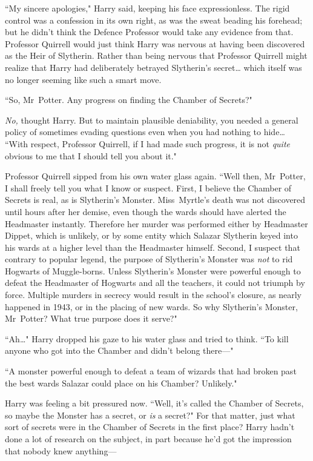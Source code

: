 ``My sincere apologies," Harry said, keeping his face expressionless. The rigid control was a confession in its own right, as was the sweat beading his forehead; but he didn't think the Defence Professor would take any evidence from that. Professor Quirrell would just think Harry was nervous at having been discovered as the Heir of Slytherin. Rather than being nervous that Professor Quirrell might realize that Harry had deliberately betrayed Slytherin's secret{\ldots} which itself was no longer seeming like such a smart move.

``So, Mr~Potter. Any progress on finding the Chamber of Secrets?"

\emph{No,} thought Harry. But to maintain plausible deniability, you needed a general policy of sometimes evading questions even when you had nothing to hide{\ldots} ``With respect, Professor Quirrell, if I had made such progress, it is not \emph{quite} obvious to me that I should tell you about it."

Professor Quirrell sipped from his own water glass again. ``Well then, Mr~Potter, I shall freely tell you what I know or suspect. First, I believe the Chamber of Secrets is real, as is Slytherin's Monster. Miss~Myrtle's death was not discovered until hours after her demise, even though the wards should have alerted the Headmaster instantly. Therefore her murder was performed either by Headmaster Dippet, which is unlikely, or by some entity which Salazar Slytherin keyed into his wards at a higher level than the Headmaster himself. Second, I suspect that contrary to popular legend, the purpose of Slytherin's Monster was \emph{not} to rid Hogwarts of Muggle-borns. Unless Slytherin's Monster were powerful enough to defeat the Headmaster of Hogwarts and all the teachers, it could not triumph by force. Multiple murders in secrecy would result in the school's closure, as nearly happened in 1943, or in the placing of new wards. So why Slytherin's Monster, Mr~Potter? What true purpose does it serve?"

``Ah{\ldots}" Harry dropped his gaze to his water glass and tried to think. ``To kill anyone who got into the Chamber and didn't belong there—"

``A monster powerful enough to defeat a team of wizards that had broken past the best wards Salazar could place on his Chamber? Unlikely."

Harry was feeling a bit pressured now. ``Well, it's called the Chamber of Secrets, so maybe the Monster has a secret, or \emph{is} a secret?" For that matter, just what sort of secrets were in the Chamber of Secrets in the first place? Harry hadn't done a lot of research on the subject, in part because he'd got the impression that nobody knew anything—


